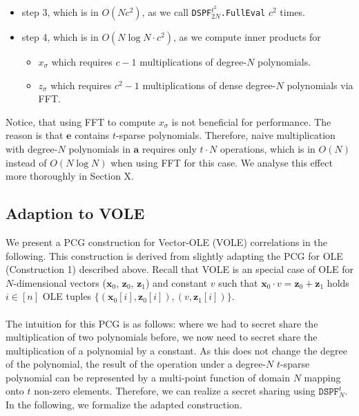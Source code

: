 \begin{itemize}
\item step 3, which is in $O(Nc^2)$, as we call \texttt{DSPF$^{t^2}_{2N}$.FullEval} $c^2$ times.
\item step 4, which is in $O(N\log N \cdot c^2)$, as we compute inner products for
\begin{itemize}
\item $x_{\sigma}$ which requires $c-1$ multiplications of degree-$N$ polynomials.
\item $z_{\sigma}$ which requires $c^2-1$ multiplications of dense degree-$N$ polynomials via FFT.
\end{itemize}
\end{itemize}

Notice, that using FFT to compute $x_{\sigma}$ is not beneficial for performance. The reason is that $\boldsymbol{e}$ contains $t$-sparse polynomials. Therefore, naive multiplication with degree-$N$ polynomials in $\boldsymbol{a}$ requires only $t\cdot N$ operations, which is in $O(N)$ instead of $O(N\log N)$ when using FFT for this case. We analyse this effect more thoroughly in Section X.

\subsection{Adaption to VOLE}
We present a PCG construction for Vector-OLE (VOLE) correlations in the following. This construction is derived from slightly adapting the PCG for OLE (Construction 1) described above. Recall that VOLE is an special case of OLE for $N$-dimensional vectors ($\mathbf{x}_0$, $\mathbf{z}_0$, $\mathbf{z}_1$) and constant $v$ such that $\mathbf{x}_0\cdot v = \mathbf{z}_0 + \mathbf{z}_1$ holds $i \in [n]$ OLE tuples $\{(\mathbf{x}_0[i], \mathbf{z}_0[i]),(v, \mathbf{z}_1[i])\}$. 
\\\\
The intuition for this PCG is as follows: where we had to secret share the multiplication of two polynomials before, we now need to secret share the multiplication of a polynomial by a constant. As this does not change the degree of the polynomial, the result of the operation under a degree-$N$ $t$-sparse polynomial can be represented by a multi-point function of domain $N$ mapping onto $t$ non-zero elements. Therefore, we can realize a secret sharing using $\texttt{DSPF}^{t}_{N}$. In the following, we formalize the adapted construction.

